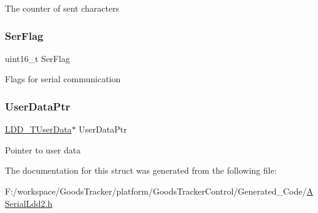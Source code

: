 The counter of sent characters \mbox{\label{struct_a_serial_ldd2___t_device_data_afd48e3955f613be6122b2c347bdeb3b5}} 
\subsubsection{\texorpdfstring{Ser\+Flag}{SerFlag}}
{\footnotesize\ttfamily uint16\+\_\+t Ser\+Flag}

Flags for serial communication \mbox{\label{struct_a_serial_ldd2___t_device_data_a8e77b9d030b00c231823350a904e0f83}} 
\subsubsection{\texorpdfstring{User\+Data\+Ptr}{UserDataPtr}}
{\footnotesize\ttfamily \hyperlink{group___p_e___types__module_ga0b66a73f87238a782318aa0be7578e35}{L\+D\+D\+\_\+\+T\+User\+Data}$\ast$ User\+Data\+Ptr}

Pointer to user data 

The documentation for this struct was generated from the following file\+:\begin{DoxyCompactItemize}
\item 
F\+:/workspace/\+Goods\+Tracker/platform/\+Goods\+Tracker\+Control/\+Generated\+\_\+\+Code/\hyperlink{_a_serial_ldd2_8h}{A\+Serial\+Ldd2.\+h}\end{DoxyCompactItemize}
